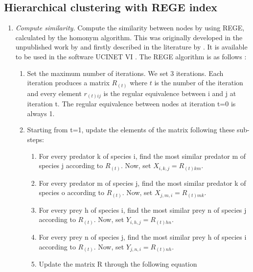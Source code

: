 \documentclass[twocolumn]{article}
\begin{document}
\begin{appendices}
		\section{Hierarchical clustering with REGE index}
		\label{appendix:b}
		\begin{enumerate}
				\item \emph{Compute similarity.} \smallskip \newline
							Compute the similarity between nodes by using REGE, calculated by the homonym algorithm. This was originally developed in the unpublished work by \citet{White1980,White1982,White1984} and firstly described in the literature by \citet{Borgatti1993}. It is available to be used in the software UCINET VI \citet{Borgatti2002}. The REGE algorithm is as follows \citep{Jordan2018}:
				      \begin{enumerate}
					      \item Set the maximum number of iterations. We set 3 iterations. Each iteration produces a matrix $R_{\left(t\right)}$ where $t$ is the number of the iteration and every element $r_{\left(t\right)ij}$ is the regular equivalence between i and j at iteration t. The regular equivalence between nodes at iteration t=0 is always 1.
					      \item Starting from t=1, update the elements of the matrix following these sub-steps:
					            \begin{enumerate}
						            \item For every predator k of species i, find the most similar predator m of species j according to  $R_{\left(t\right)}$.
						                  Now, set $X_{i,k,j}=R_{\left(t\right)km}.
						                  $
						            \item For every predator m of species j, find the most similar predator k of species o according to $R_{\left(t\right)}$.
						                  Now, set $X_{j,m,i}=R_{\left(t\right)mk}$.
						            \item For every prey h of species i, find the most similar prey n of species j according to $R_{\left(t\right)}$.
						                  Now, set $Y_{i,h,j}=R_{\left(t\right)hn}$.
						            \item For every prey n of species j, find the most similar prey h of species i according to $R_{\left(t\right)}$.
						                  Now, set $Y_{j,n,i}=R_{\left(t\right)nh}$.
						            \item Update the matrix R through the following equation

\end{enumerate}
\end{enumerate}
\end{enumerate}
\end{appendices}
\end{document}
